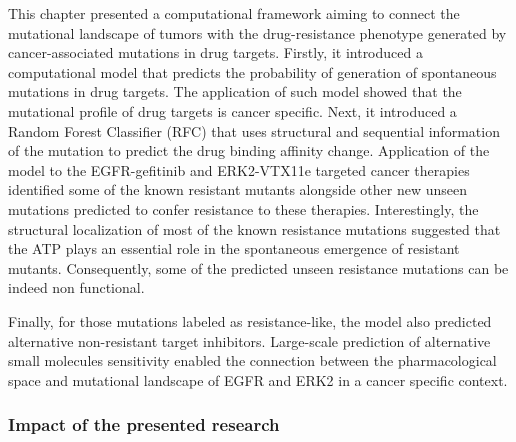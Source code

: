 \documentclass[11pt, b5paper,twoside]{tesi_upf}
\begin{document}
\par This chapter presented a computational framework aiming to connect the mutational landscape of tumors with the drug-resistance phenotype generated by cancer-associated mutations in drug targets. Firstly, it introduced a computational model that predicts the probability of generation of spontaneous mutations in drug targets. The application of such model showed that the mutational profile of drug targets is cancer specific. Next, it introduced a Random Forest Classifier (RFC) that uses structural and sequential information of the mutation to predict the drug binding affinity change.  Application of the model to the EGFR-gefitinib and ERK2-VTX11e targeted cancer therapies identified some of the known resistant mutants alongside other new unseen mutations predicted to confer resistance to these therapies. Interestingly, the structural localization of most of the known resistance mutations suggested that the ATP plays an essential role in the spontaneous emergence of resistant mutants. Consequently, some of the predicted unseen resistance mutations can be indeed non functional.  
\par Finally, for those mutations labeled as resistance-like, the model also predicted alternative non-resistant target inhibitors. Large-scale prediction of alternative small molecules sensitivity enabled the connection between the pharmacological space and mutational landscape of EGFR and ERK2 in a cancer specific context.

\subsubsection{Impact of the presented research}
 
\end{document}
